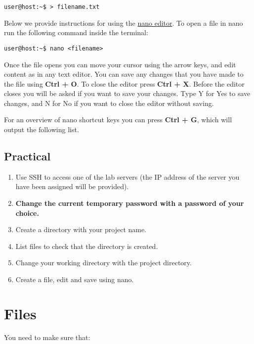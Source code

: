 \documentclass[
]{book}
\begin{document}
\begin{verbatim}
user@host:~$ > filename.txt
\end{verbatim}

Below we provide instructions for using the
\href{https://www.nano-editor.org/}{nano editor}. To open a file in nano run the following command inside the
terminal:

\begin{verbatim}
user@host:~$ nano <filename>
\end{verbatim}

Once the file opens you can move your cursor using the arrow keys, and edit content
as in any text editor. You can save any changes that you have made to the file
using \textbf{Ctrl + O}. To close the editor press \textbf{Ctrl + X}. Before the editor
closes you will be asked if you want to save your changes. Type Y for Yes to
save changes, and N for No if you want to close the editor without saving.

For an overview of nano shortcut keys you can press \textbf{Ctrl + G}, which will output the following list.

\hypertarget{practical}{%
\section{Practical}\label{practical}}

\begin{enumerate}
\def\labelenumi{\arabic{enumi})}
\item
  Use SSH to access one of the lab servers (the IP address of the server you have been assigned will be provided).
\item
  \textbf{Change the current temporary password with a password of your choice.}
\item
  Create a directory with your project name.
\item
  List files to check that the directory is created.
\item
  Change your working directory with the project directory.
\item
  Create a file, edit and save using nano.
\end{enumerate}

\hypertarget{files}{%
\chapter{Files}\label{files}}

You need to make sure that:
\end{document}
